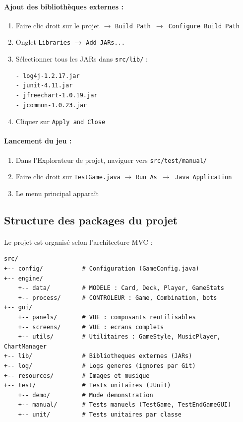 \paragraph{Ajout des bibliothèques externes :}
\begin{enumerate}
\item Faire clic droit sur le projet $\rightarrow$ \texttt{Build Path $\rightarrow$ Configure Build Path}
\item Onglet \texttt{Libraries} $\rightarrow$ \texttt{Add JARs...}
\item Sélectionner tous les JARs dans \texttt{src/lib/} :
\begin{verbatim}
- log4j-1.2.17.jar
- junit-4.11.jar
- jfreechart-1.0.19.jar
- jcommon-1.0.23.jar
\end{verbatim}
\item Cliquer sur \texttt{Apply and Close}
\end{enumerate}

\paragraph{Lancement du jeu :}
\begin{enumerate}
\item Dans l'Explorateur de projet, naviguer vers \texttt{src/test/manual/}
\item Faire clic droit sur \texttt{TestGame.java} $\rightarrow$ \texttt{Run As $\rightarrow$ Java Application}
\item Le menu principal apparaît
\end{enumerate}

\subsection{Structure des packages du projet}
\paragraph{} Le projet est organisé selon l'architecture MVC :

\begin{verbatim}
src/
+-- config/           # Configuration (GameConfig.java)
+-- engine/
    +-- data/         # MODELE : Card, Deck, Player, GameStats
    +-- process/      # CONTROLEUR : Game, Combination, bots
+-- gui/
    +-- panels/       # VUE : composants reutilisables
    +-- screens/      # VUE : ecrans complets
    +-- utils/        # Utilitaires : GameStyle, MusicPlayer, ChartManager
+-- lib/              # Bibliotheques externes (JARs)
+-- log/              # Logs generes (ignores par Git)
+-- resources/        # Images et musique
+-- test/             # Tests unitaires (JUnit)
    +-- demo/         # Mode demonstration
    +-- manual/       # Tests manuels (TestGame, TestEndGameGUI)
    +-- unit/         # Tests unitaires par classe
\end{verbatim}

